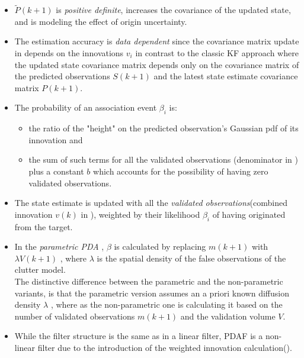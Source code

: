 \begin{itemize}
	\item $\tilde{P}(k+1)$ is \emph{positive definite}, increases the covariance of the updated state, and is modeling the effect of origin uncertainty.
	\item The estimation accuracy is \emph{data dependent} since the covariance matrix update in  depends on the innovations $v_i$ in contrast to the classic KF approach where the updated state covariance matrix depends only on the covariance matrix of the predicted observations $S(k+1)$ and the latest state estimate covariance matrix $P(k+1)$.
	\item The probability of an association event $\beta_i$ is:
	\begin{itemize}
		\item the ratio of the "height" on the predicted observation's Gaussian pdf of its innovation and
		\item the sum of such terms for all the validated observations (denominator in ) plus a constant $b$ which accounts for the possibility of having zero validated observations.
	\end{itemize}
	\item The state estimate is updated with all the \emph{validated observations}(combined innovation $v(k)$ in ), weighted by their likelihood $\beta_i$ of having originated from the target.
	\item In the \emph{parametric PDA} , $\beta$ is calculated by replacing $m(k+1)$ with $\lambda V(k+1)$ , where $\lambda$ is the spatial density of the false observations of the clutter model. \\
	
	The distinctive difference between the parametric and the non-parametric variants, is that the parametric version assumes an a priori known diffusion density $\lambda$ , where as the non-parametric one is calculating it based on the number of validated observations $m(k+1)$ and the validation volume $V$.
	
	\item While the filter structure is the same as in a linear filter, PDAF is a non-linear filter due to the introduction of the weighted innovation calculation().
\end{itemize}


